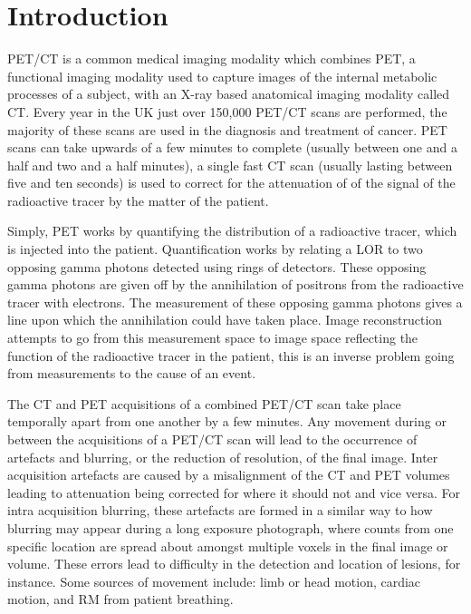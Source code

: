 \chapter{Introduction} \label{introduction}
    \blindtext
    
        \gls{PET}/\gls{CT} is a common medical imaging modality which combines \gls{PET}, a functional imaging modality used to capture images of the internal metabolic processes of a subject, with an X-ray based anatomical imaging modality called \gls{CT}. Every year in the UK just over 150,000 \gls{PET}/\gls{CT} scans are performed, the majority of these scans are used in the diagnosis and treatment of cancer. \gls{PET} scans can take upwards of a few minutes to complete (usually between one and a half and two and a half minutes), a single fast \gls{CT} scan (usually lasting between five and ten seconds) is used to correct for the attenuation of of the signal of the radioactive tracer by the matter of the patient.
        
        Simply, \gls{PET} works by quantifying the distribution of a radioactive tracer, which is injected into the patient. Quantification works by relating a \gls{LOR} to two opposing gamma photons detected using rings of detectors. These opposing gamma photons are given off by the annihilation of positrons from the radioactive tracer with electrons. The measurement of these opposing gamma photons gives a line upon which the annihilation could have taken place. Image reconstruction attempts to go from this measurement space to image space reflecting the function of the radioactive tracer in the patient, this is an inverse problem going from measurements to the cause of an event.
        
        The \gls{CT} and \gls{PET} acquisitions of a combined \gls{PET}/\gls{CT} scan take place temporally apart from one another by a few minutes. Any movement during or between the acquisitions of a \gls{PET}/\gls{CT} scan will lead to the occurrence of artefacts and blurring, or the reduction of resolution, of the final image. Inter acquisition artefacts are caused by a misalignment of the \gls{CT} and \gls{PET} volumes leading to attenuation being corrected for where it should not and vice versa. For intra acquisition blurring, these artefacts are formed in a similar way to how blurring may appear during a long exposure photograph, where counts from one specific location are spread about amongst multiple voxels in the final image or volume. These errors lead to difficulty in the detection and location of lesions, for instance. Some sources of movement include: limb or head motion, cardiac motion, and \gls{RM} from patient breathing.
        

